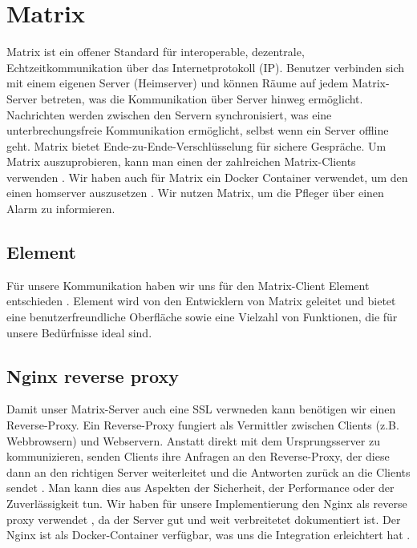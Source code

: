\section{Matrix}

Matrix ist ein offener Standard für interoperable, dezentrale, Echtzeitkommunikation über das Internetprotokoll (IP). Benutzer verbinden sich mit einem eigenen Server (Heimserver) und können Räume auf jedem Matrix-Server betreten, was die Kommunikation über Server hinweg ermöglicht. Nachrichten werden zwischen den Servern synchronisiert, was eine unterbrechungsfreie Kommunikation ermöglicht, selbst wenn ein Server offline geht. Matrix bietet Ende-zu-Ende-Verschlüsselung für sichere Gespräche. Um Matrix auszuprobieren, kann man einen der zahlreichen  Matrix-Clients verwenden \cite{noauthor_introduction_nodate}.  Wir haben auch für Matrix ein Docker Container verwendet, um den einen homserver auszusetzen \cite{noauthor_matrixdotorgsynapse_nodate}.  Wir nutzen Matrix, um die Pfleger über einen Alarm zu informieren. 

\subsection{Element}
Für unsere Kommunikation haben wir uns für den Matrix-Client Element entschieden \cite{noauthor_element_nodate}. Element wird von den Entwicklern von Matrix geleitet und bietet eine benutzerfreundliche Oberfläche sowie eine Vielzahl von Funktionen, die für unsere Bedürfnisse ideal sind. 


\subsection{Nginx reverse proxy}

Damit unser Matrix-Server auch eine SSL verwneden kann benötigen wir einen Reverse-Proxy. Ein Reverse-Proxy fungiert als Vermittler zwischen Clients (z.B. Webbrowsern) und Webservern. Anstatt direkt mit dem Ursprungsserver zu kommunizieren, senden Clients ihre Anfragen an den Reverse-Proxy, der diese dann an den richtigen Server weiterleitet und die Antworten zurück an die Clients sendet \cite{noauthor_was_nodate}. Man kann dies aus Aspekten der Sicherheit, der Performance oder der Zuverlässigkeit tun. Wir haben für unsere Implementierung den Nginx als reverse proxy verwendet \cite{noauthor_nginx_nodate}, da der  Server gut und weit verbreitetet dokumentiert ist. Der Nginx ist als Docker-Container verfügbar, was uns die Integration  erleichtert hat \cite{noauthor_nginx_nodate}. 


